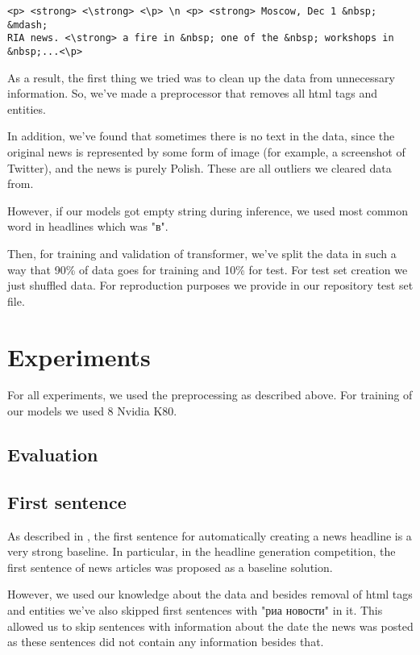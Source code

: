 \documentclass{dialogue}
\begin{document}
\begin{verbatim}
<p> <strong> <\strong> <\p> \n <p> <strong> Moscow, Dec 1 &nbsp; &mdash;
RIA news. <\strong> a fire in &nbsp; one of the &nbsp; workshops in
&nbsp;...<\p>
\end{verbatim}

As a result, the first thing we tried was to clean up the data from unnecessary information. So, we've made a preprocessor that removes all html tags and entities.

In addition, we've found that sometimes there is no text in the data, since the original news is represented by some form of image (for example, a screenshot of Twitter), and the news is purely Polish. These are all outliers we cleared data from.

However, if our models got empty string during inference, we used most common word in headlines which was "в".

Then, for training and validation of transformer, we've split the data in such a way that 90\% of data goes for training and 10\% for test. For test set creation we just shuffled data. For reproduction purposes we provide in our repository test set file.

\section{Experiments}
For all experiments, we used the preprocessing as described above. For training of our models we used 8 Nvidia K80.

\subsection{Evaluation}


\subsection{First sentence}

As described in \cite{Putra2018IncorporatingTS}, the first sentence for automatically creating a news headline is a very strong baseline. In particular, in the headline generation competition, the first sentence of news articles was proposed as a baseline solution.

However, we used our knowledge about the data and besides removal of html tags and entities we've also skipped first sentences with "риа новости" in it. This allowed us to skip sentences with information about the date the news was posted as these sentences did not contain any information besides that.
\end{document}
